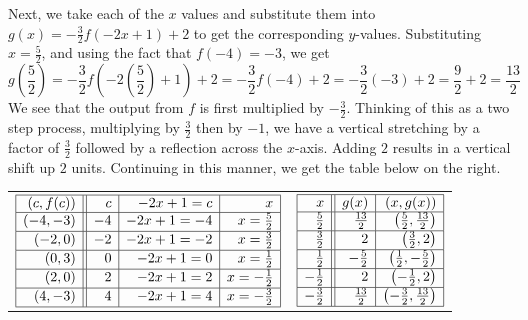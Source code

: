 \begin{ex}
Next, we take each of the $x$ values and substitute them into $g(x) = -\frac{3}{2}f(-2x+1) +2$ to get the corresponding $y$-values.  Substituting  $x=\frac{5}{2}$, and using the fact that $f(-4)=-3$, we get \[g\left(\frac{5}{2}\right) = -\frac{3}{2}f\left(-2\left(\frac{5}{2}\right) +1\right) +2 = -\frac{3}{2} f(-4) + 2 = -\frac{3}{2}(-3) + 2 = \frac{9}{2} + 2 = \frac{13}{2}\]  We see that the output from $f$ is first multiplied by $-\frac{3}{2}$.  Thinking of this as a two step process, multiplying by $\frac{3}{2}$ then by $-1$, we have  a vertical stretching by a factor of $\frac{3}{2}$ followed by a reflection across the $x$-axis.  Adding $2$ results in a vertical shift up $2$ units.  Continuing in this manner, we get the table below on the right.

\begin{center}

\begin{tabular}{cc}

$\begin{array}{|r||r|r|r|}  

\hline

(c,f(c))& c & -2x+1=c & x \\ \hline
(-4,-3) & -4 & -2x+1 = -4 & x = \frac{5}{2} \\ [1pt] \hline
(-2,0) &  -2 &  -2x+1 = -2 & x = \frac{3}{2} \\  [1pt] \hline
(0,3) & 0  & -2x+1 = 0 &  x = \frac{1}{2} \\ [1pt] \hline
(2,0)  & 2 & -2x+1 = 2  &  x = -\frac{1}{2} \\[1pt] \hline
(4,-3) & 4 & -2x+1 = 4  & x = -\frac{3}{2}  \\ [1pt] \hline

\end{array}$

&

$\begin{array}{|r||r|r|}  

\hline

 x & g(x) &  (x, g(x)) \\ \hline
\frac{5}{2}  & \frac{13}{2} &  \left(\frac{5}{2}, \frac{13}{2} \right) \\ [1pt] \hline
\frac{3}{2}  & 2 & \left(\frac{3}{2}, 2 \right)\\ [1pt] \hline
\frac{1}{2}  & - \frac{5}{2} & \left(\frac{1}{2}, -\frac{5}{2} \right)  \\ [1pt] \hline
-\frac{1}{2} & 2 &  \left(-\frac{1}{2}, 2 \right) \\ [1pt] \hline
-\frac{3}{2} & \frac{13}{2} &  \left(-\frac{3}{2}, \frac{13}{2} \right) \\ [1pt] \hline
\end{array}$


\end{tabular}
\end{center}
\end{ex}
